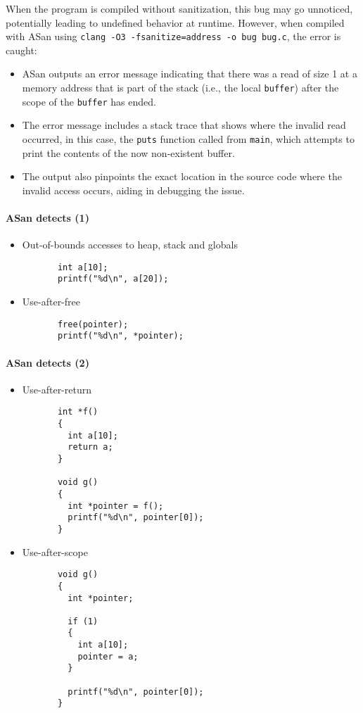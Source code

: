 \documentclass[12pt]{article}
\begin{document}
When the program is compiled without sanitization, this bug may go unnoticed, potentially leading to undefined behavior at runtime. However, when compiled with ASan using \texttt{clang -O3 -fsanitize=address -o bug bug.c}, the error is caught:

\begin{itemize}
    \item ASan outputs an error message indicating that there was a read of size 1 at a memory address that is part of the stack (i.e., the local \texttt{buffer}) after the scope of the \texttt{buffer} has ended.
    \item The error message includes a stack trace that shows where the invalid read occurred, in this case, the \texttt{puts} function called from \texttt{main}, which attempts to print the contents of the now non-existent buffer.
    \item The output also pinpoints the exact location in the source code where the invalid access occurs, aiding in debugging the issue.
\end{itemize}

\paragraph{ASan detects (1)}

\begin{itemize}
  \item Out-of-bounds accesses to heap, stack and globals
    \begin{verbatim}
       int a[10];
       printf("%d\n", a[20]);
    \end{verbatim}

  \item Use-after-free
    \begin{verbatim}
       free(pointer);
       printf("%d\n", *pointer);
    \end{verbatim}
\end{itemize}
\paragraph{ASan detects (2)}

\begin{itemize}
  \item Use-after-return
    \begin{verbatim}
       int *f()
       {
         int a[10];
         return a;
       }
       
       void g()
       {
         int *pointer = f();
         printf("%d\n", pointer[0]);
       }
    \end{verbatim}

  \item Use-after-scope
    \begin{verbatim}
       void g()
       {
         int *pointer;
         
         if (1)
         {
           int a[10];
           pointer = a;
         }
          
         printf("%d\n", pointer[0]);
       }
    \end{verbatim}
\end{itemize}
\end{document}

